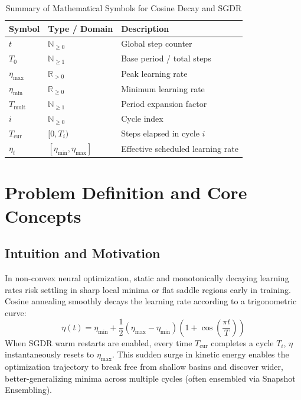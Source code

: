 \documentclass[11pt,a4paper]{article}
\theoremstyle{definition}
\begin{document}
\begin{table}[h]
\centering
\caption{Summary of Mathematical Symbols for Cosine Decay and SGDR}
\begin{tabular}{lll}
\toprule
\textbf{Symbol} & \textbf{Type / Domain} & \textbf{Description} \\
\midrule
$t$ & $\mathbb{N}_{\ge 0}$ & Global step counter \\
$T_0$ & $\mathbb{N}_{\ge 1}$ & Base period / total steps \\
$\eta_{\max}$ & $\mathbb{R}_{> 0}$ & Peak learning rate \\
$\eta_{\min}$ & $\mathbb{R}_{\ge 0}$ & Minimum learning rate \\
$T_{\text{mult}}$ & $\mathbb{N}_{\ge 1}$ & Period expansion factor \\
$i$ & $\mathbb{N}_{\ge 0}$ & Cycle index \\
$T_{\text{cur}}$ & $[0, T_i)$ & Steps elapsed in cycle $i$ \\
$\eta_t$ & $[\eta_{\min}, \eta_{\max}]$ & Effective scheduled learning rate \\
\bottomrule
\end{tabular}
\end{table}

\section{Problem Definition and Core Concepts}

\subsection{Intuition and Motivation}
In non-convex neural optimization, static and monotonically decaying learning rates risk settling in sharp local minima or flat saddle regions early in training. Cosine annealing smoothly decays the learning rate according to a trigonometric curve:
\begin{equation}
\eta(t) = \eta_{\min} + \frac{1}{2}(\eta_{\max} - \eta_{\min}) \left(1 + \cos\left(\frac{\pi t}{T}\right)\right)
\end{equation}
When SGDR warm restarts are enabled, every time $T_{\text{cur}}$ completes a cycle $T_i$, $\eta$ instantaneously resets to $\eta_{\max}$. This sudden surge in kinetic energy enables the optimization trajectory to break free from shallow basins and discover wider, better-generalizing minima across multiple cycles (often ensembled via Snapshot Ensembling).
\end{document}

